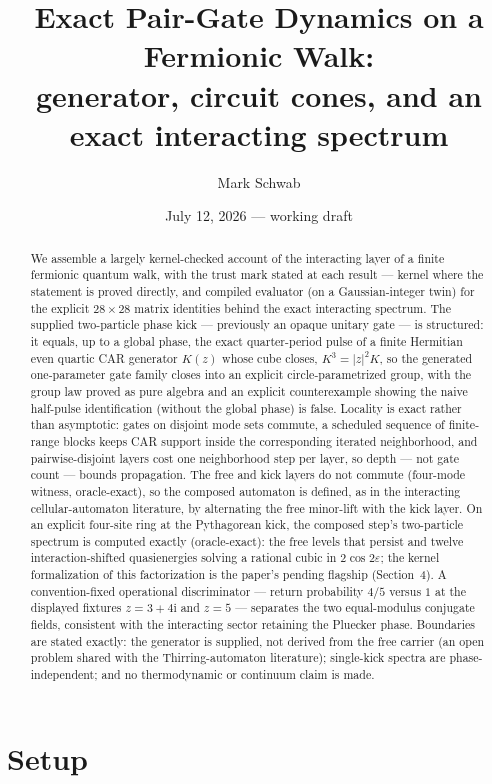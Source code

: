 \documentclass[11pt]{article}
\title{Exact Pair-Gate Dynamics on a Fermionic Walk:\\
generator, circuit cones, and an exact interacting spectrum}
\author{Mark Schwab}
\date{July 12, 2026 --- working draft}
\newcommand{\ii}{\mathrm{i}}
\begin{document}
\maketitle

\begin{abstract}
We assemble a largely kernel-checked account of the interacting layer of
a finite fermionic quantum walk, with the trust mark stated at each
result --- kernel where the statement is proved directly, and compiled
evaluator (on a Gaussian-integer twin) for the explicit $28\times28$
matrix identities behind the exact interacting spectrum.  The supplied two-particle phase kick ---
previously an opaque unitary gate --- is structured: it equals, up to a
global phase, the exact quarter-period pulse of a finite Hermitian even
quartic CAR generator $K(z)$ whose cube closes, $K^3=|z|^2K$, so the
generated one-parameter gate family closes into an explicit
circle-parametrized group, with the group law proved as pure algebra and an explicit
counterexample showing the naive half-pulse identification (without the
global phase) is false.  Locality is exact rather than asymptotic:
gates on disjoint mode sets commute, a scheduled sequence of finite-range
blocks keeps CAR support inside the corresponding iterated neighborhood,
and pairwise-disjoint layers cost one neighborhood step per layer, so
depth --- not gate count --- bounds propagation.  The free and kick
layers do not commute (four-mode witness, oracle-exact), so the composed
automaton is defined, as in the interacting
cellular-automaton literature, by alternating the free minor-lift with
the kick layer.  On an explicit four-site ring at the Pythagorean kick,
the composed step's two-particle spectrum is computed exactly
(oracle-exact): the free levels that persist and twelve
interaction-shifted quasienergies solving a rational cubic in
$2\cos2\varepsilon$; the kernel formalization of this factorization is
the paper's pending flagship (Section~4).  A
convention-fixed operational discriminator --- return probability $4/5$
versus $1$ at the displayed fixtures
$z=3+4\ii$ and $z=5$ --- separates the two equal-modulus conjugate
fields, consistent with the interacting sector retaining the Pluecker
phase.  Boundaries are stated exactly: the
generator is supplied, not derived from the free carrier (an open
problem shared with the Thirring-automaton literature); single-kick
spectra are phase-independent; and no thermodynamic or continuum claim
is made.
\end{abstract}

\section{Setup}
\end{document}
